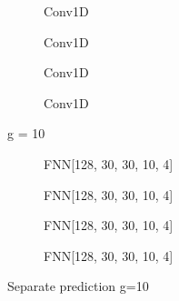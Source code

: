 \documentclass[a4paper,times,12pt]{article}
\begin{document}
\begin{figure}[H]
    \centering
    \begin{subfigure}[t]{0.45\textwidth}
		\centering
        
        \caption{Conv1D}
		\label{fig:a}
    \end{subfigure}\hfill
    \begin{subfigure}[t]{0.45\textwidth}
		\centering
        
        \caption{Conv1D}
		\label{fig:b}
    \end{subfigure}\hfill    
    \begin{subfigure}[t]{0.45\textwidth}
        \centering
        
        \caption{Conv1D}
		\label{fig:c}
    \end{subfigure}\hfill
    \begin{subfigure}[t]{0.45\textwidth}
        \centering
        
        \caption{Conv1D}
		\label{fig:c}
    \end{subfigure}
	\caption{g = 10}
\end{figure}

\begin{figure}[H]
    \centering
    \begin{subfigure}[t]{0.45\textwidth}
		\centering
        
        \caption{FNN[128, 30, 30, 10, 4]}
		\label{fig:a}
    \end{subfigure}\hfill
    \begin{subfigure}[t]{0.45\textwidth}
		\centering
        
        \caption{FNN[128, 30, 30, 10, 4]}
		\label{fig:b}
    \end{subfigure}\hfill    
    \begin{subfigure}[t]{0.45\textwidth}
        \centering
        
        \caption{FNN[128, 30, 30, 10, 4]}
		\label{fig:c}
    \end{subfigure}\hfill
    \begin{subfigure}[t]{0.45\textwidth}
        \centering
        
        \caption{FNN[128, 30, 30, 10, 4]}
		\label{fig:c}
    \end{subfigure}
	\caption{Separate prediction  g=10}
\end{figure}
\end{document}
